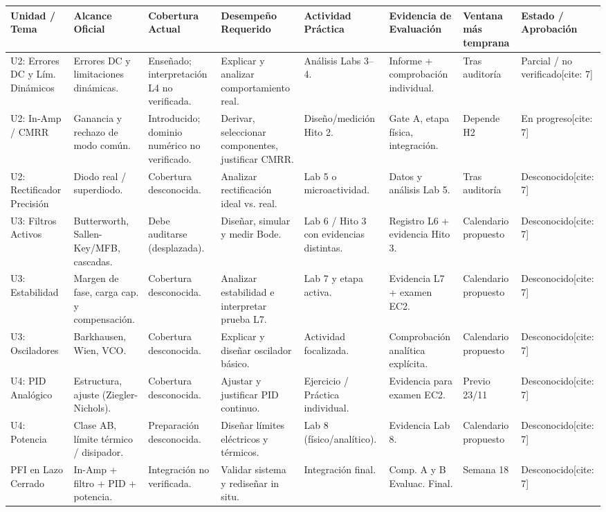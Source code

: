 \documentclass[10pt, a4paper, landscape]{article}
\begin{document}
\begin{table}[htbp]
    \centering
    \scriptsize
    \renewcommand{\arraystretch}{1.3}
    \begin{tabularx}{\textwidth}{|P{1.8cm}|P{2.3cm}|P{2.5cm}|P{2.5cm}|P{2.5cm}|P{2.5cm}|P{1.8cm}|Y|}
    \hline
    \textbf{Unidad / Tema} & \textbf{Alcance Oficial} & \textbf{Cobertura Actual} & \textbf{Desempeño Requerido} & \textbf{Actividad Práctica} & \textbf{Evidencia de Evaluación} & \textbf{Ventana más temprana} & \textbf{Estado / Aprobación} \\ \hline
    U2: Errores DC y Lím. Dinámicos & Errores DC y limitaciones dinámicas. & Enseñado; interpretación L4 no verificada. & Explicar y analizar comportamiento real. & Análisis Labs 3--4. & Informe + comprobación individual. & Tras auditoría & Parcial / no verificado[cite: 7] \\ \hline
    U2: In-Amp / CMRR & Ganancia y rechazo de modo común. & Introducido; dominio numérico no verificado. & Derivar, seleccionar componentes, justificar CMRR. & Diseño/medición Hito 2. & Gate A, etapa física, integración. & Depende H2 & En progreso[cite: 7] \\ \hline
    U2: Rectificador Precisión & Diodo real / superdiodo. & Cobertura desconocida. & Analizar rectificación ideal vs. real. & Lab 5 o microactividad. & Datos y análisis Lab 5. & Tras auditoría & Desconocido[cite: 7] \\ \hline
    U3: Filtros Activos & Butterworth, Sallen-Key/MFB, cascadas. & Debe auditarse (desplazada). & Diseñar, simular y medir Bode. & Lab 6 / Hito 3 con evidencias distintas. & Registro L6 + evidencia Hito 3. & Calendario propuesto & Desconocido[cite: 7] \\ \hline
    U3: Estabilidad & Margen de fase, carga cap. y compensación. & Cobertura desconocida. & Analizar estabilidad e interpretar prueba L7. & Lab 7 y etapa activa. & Evidencia L7 + examen EC2. & Calendario propuesto & Desconocido[cite: 7] \\ \hline
    U3: Osciladores & Barkhausen, Wien, VCO. & Cobertura desconocida. & Explicar y diseñar oscilador básico. & Actividad focalizada. & Comprobación analítica explícita. & Calendario propuesto & Desconocido[cite: 7] \\ \hline
    U4: PID Analógico & Estructura, ajuste (Ziegler-Nichols). & Cobertura desconocida. & Ajustar y justificar PID continuo. & Ejercicio / Práctica individual. & Evidencia para examen EC2. & Previo 23/11 & Desconocido[cite: 7] \\ \hline
    U4: Potencia & Clase AB, límite térmico / disipador. & Preparación desconocida. & Diseñar límites eléctricos y térmicos. & Lab 8 (físico/analítico). & Evidencia Lab 8. & Calendario propuesto & Desconocido[cite: 7] \\ \hline
    PFI en Lazo Cerrado & In-Amp + filtro + PID + potencia. & Integración no verificada. & Validar sistema y rediseñar in situ. & Integración final. & Comp. A y B Evaluac. Final. & Semana 18 & Desconocido[cite: 7] \\ \hline
    \end{tabularx}
\end{table}
\end{document}
